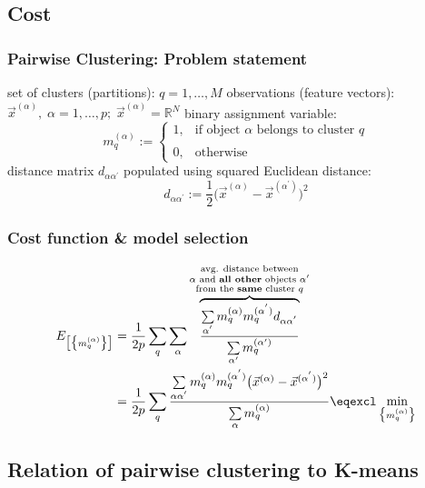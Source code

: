 \subsection{Cost}

\begin{frame}
\frametitle{Pairwise Clustering: Problem statement}

\begin{itemize}
\itr set of clusters (partitions): $q = 1, \ldots, M$
\itr observations (feature vectors): $\vec{x}^{(\alpha)}, \; 
\alpha = 1, \ldots, p; \; \vec{x}^{(\alpha)} = \mathbb{R}^N$
\itr binary assignment variable:
$$ m_q^{(\alpha)} := \left\{ \begin{array}{ll}
		1, & \text{if object } \alpha \text{ belongs to cluster } q \\\\
		0, & \text{otherwise}
	\end{array} \right.
$$
\itr distance matrix $d_{\alpha \alpha^{'}}$ populated using squared Euclidean distance:
$$
	d_{\alpha \alpha^{'}} := \frac{1}{2} \big( \vec{x}^{(\alpha)} 
		- \vec{x}^{(\alpha^{'})} \big)^2
$$
\end{itemize}
\end{frame}
\begin{frame}
\frametitle{Cost function \& model selection}
\begin{align}
E_{ \big[ \big\{ m_q^{(\alpha)} \big\} \big] }
	&= \frac{1}{2p} \sum\limits_q \sum\limits_{\alpha}
	 \overbrace{ \frac{\sum\limits_{\alpha^{'}} 
		m_q^{(\alpha)}m_q^{(\alpha^{'})} d_{\alpha \alpha^{'}}}{
                \sum\limits_{\alpha'} m_q^{(\alpha')}
		}}^{ \substack{	\text{avg. distance between} \\
				\alpha \text{ and \textbf{all other} objects $\alpha'$} \\
				\text{from the \textbf{same} cluster } q}}\\
&= \frac{1}{2p} \sum\limits_q \frac{ \sum\limits_{\alpha \alpha^{'}}
		m_q^{(\alpha)} m_q^{(\alpha^{'})} \big( \vec{x}^{(\alpha)}
		-\vec{x}^{(\alpha^{'})} \big)^2 }{
			\sum\limits_{\alpha} m_q^{(\alpha)}}
	\eqexcl \min_{\big\{ m_q^{(\alpha)} \big\}}
\end{align}
            
\end{frame}

\subsection{Relation of pairwise clustering to K-means}

